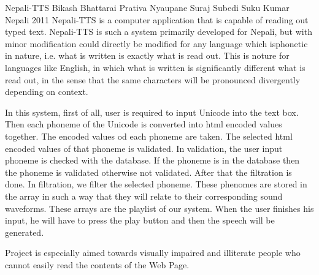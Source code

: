  \begin{conf-abstract}[]
{Nepali-TTS}
{ Bikash Bhattarai
  Prativa Nyaupane
  Suraj Subedi
  Suku Kumar Nepali 
}
{2011}
Nepali-TTS is a computer application that is capable of reading out typed text. Nepali-TTS is such a system primarily developed for Nepali, but with minor modification could directly be modified for any language which isphonetic in nature, i.e. what is written is exactly what is read out. This is noture for languages like English, in which what is written is significantly different what is read out, in the sense that the same characters will be pronounced divergently depending on context.

In this system, first of all, user is required to input Unicode into the text box. Then each phoneme of the Unicode is converted into html encoded values together. The encoded values od each phoneme are taken. The selected html encoded values of that phoneme is validated. In validation, the user input phoneme is checked with the database. If the phoneme is in the database then the phoneme is validated otherwise not validated. After that the filtration is done. In filtration, we filter the selected phoneme. These phenomes are stored in the array in such a way that they will relate to their corresponding sound waveforms. These arrays are the playlist of our system. When the user finishes his input, he will have to press the play button and then the speech will be generated.

Project is especially aimed towards visually impaired and illiterate people who cannot easily read the contents of the Web Page.  
  \end{conf-abstract}
